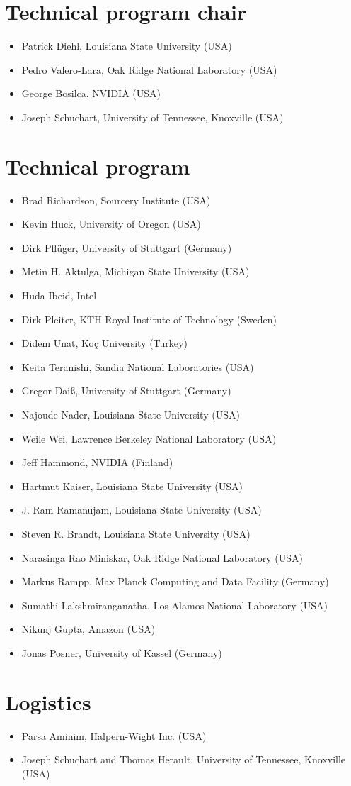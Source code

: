 \section*{Technical program chair}

\begin{itemize}
\item Patrick Diehl, Louisiana State University (USA)
\item Pedro Valero-Lara, Oak Ridge National Laboratory (USA)
\item George Bosilca, NVIDIA (USA)
\item Joseph Schuchart, University of Tennessee, Knoxville (USA)
\end{itemize}

\section*{Technical program }

\begin{itemize}
\item Brad Richardson, Sourcery Institute (USA)
\item Kevin Huck, University of Oregon (USA)
\item Dirk Pflüger, University of Stuttgart (Germany)
\item Metin H. Aktulga, Michigan State University (USA)
\item Huda Ibeid, Intel
\item Dirk Pleiter, KTH Royal Institute of Technology (Sweden)
\item Didem Unat, Koç University (Turkey)
\item Keita Teranishi, Sandia National Laboratories (USA)
\item Gregor Daiß, University of Stuttgart (Germany)
\item Najoude Nader, Louisiana State University (USA)
\item Weile Wei, Lawrence Berkeley National Laboratory (USA)
\item Jeff Hammond, NVIDIA (Finland)
\item Hartmut Kaiser, Louisiana State University (USA)
\item J. Ram Ramanujam, Louisiana State University (USA)
\item Steven R. Brandt, Louisiana State University (USA)
\item Narasinga Rao Miniskar, Oak Ridge National Laboratory (USA)
\item Markus Rampp, Max Planck Computing and Data Facility (Germany)
\item Sumathi Lakshmiranganatha, Los Alamos National Laboratory (USA)
\item Nikunj Gupta, Amazon (USA)
\item Jonas Posner, University of Kassel (Germany)
\end{itemize}


\section*{Logistics}
\begin{itemize}
\item Parsa Aminim, Halpern-Wight Inc. (USA)
\item Joseph Schuchart and Thomas Herault, University of Tennessee, Knoxville (USA)
\end{itemize}

